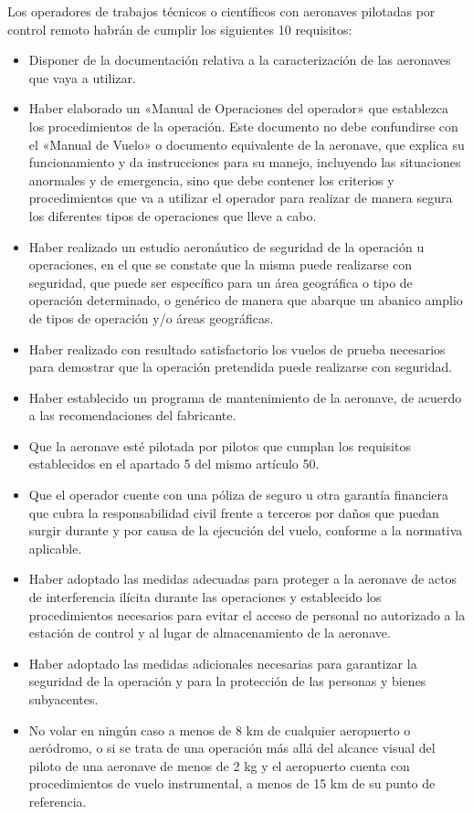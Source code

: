 Los operadores de trabajos técnicos o científicos con aeronaves pilotadas por control remoto habrán de cumplir los siguientes 10 requisitos:
\begin{itemize}
\item Disponer de la documentación relativa a la caracterización de las aeronaves que vaya a utilizar.
\item Haber elaborado un «Manual de Operaciones del operador» que establezca los procedimientos de la operación. Este documento no debe confundirse con el «Manual de Vuelo» o documento equivalente de la aeronave, que explica su funcionamiento y da instrucciones para su manejo, incluyendo las situaciones anormales y de emergencia, sino que debe contener los criterios y procedimientos que va a utilizar el operador para realizar de manera segura los diferentes tipos de operaciones que lleve a cabo.
\item Haber realizado un estudio aeronáutico de seguridad de la operación u operaciones, en el que se constate que la misma puede realizarse con seguridad, que puede ser específico para un área geográfica o tipo de operación determinado, o genérico de manera que abarque un abanico amplio de tipos de operación y/o áreas geográficas.
\item Haber realizado con resultado satisfactorio los vuelos de prueba necesarios para demostrar que la operación pretendida puede realizarse con seguridad.
\item Haber establecido un programa de mantenimiento de la aeronave, de acuerdo a las recomendaciones del fabricante.
\item Que la aeronave esté pilotada por pilotos que cumplan los requisitos establecidos en el apartado 5 del mismo artículo 50.
\item Que el operador cuente con una póliza de seguro u otra garantía financiera que cubra la responsabilidad civil frente a terceros por daños que puedan surgir durante y por causa de la ejecución del vuelo, conforme a la normativa aplicable.
\item Haber adoptado las medidas adecuadas para proteger a la aeronave de actos de interferencia ilícita durante las operaciones y establecido los procedimientos necesarios para evitar el acceso de personal no autorizado a la estación de control y al lugar de almacenamiento de la aeronave.
\item Haber adoptado las medidas adicionales necesarias para garantizar la seguridad de la operación y para la protección de las personas y bienes subyacentes.
\item No volar en ningún caso a menos de 8 km de cualquier aeropuerto o aeródromo, o si se trata de una operación más allá del alcance visual del piloto de una aeronave de menos de 2 kg y el aeropuerto cuenta con procedimientos de vuelo instrumental, a menos de 15 km de su punto de referencia.
\end{itemize}
\clearpage
